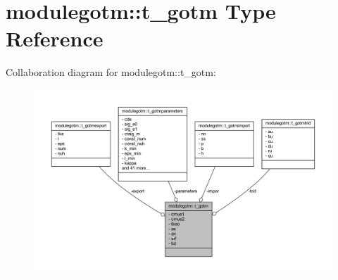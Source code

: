 \hypertarget{structmodulegotm_1_1t__gotm}{}\section{modulegotm\+:\+:t\+\_\+gotm Type Reference}
\label{structmodulegotm_1_1t__gotm}


Collaboration diagram for modulegotm\+:\+:t\+\_\+gotm\+:\nopagebreak
\begin{figure}[H]
\begin{center}
\leavevmode
\includegraphics[width=350pt]{structmodulegotm_1_1t__gotm__coll__graph}
\end{center}
\end{figure}
